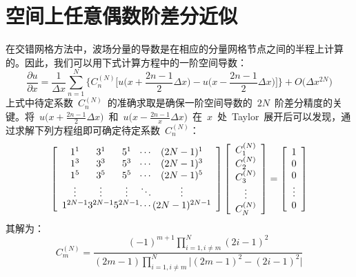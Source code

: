\documentclass[UTF8]{ctexart}
\begin{document}
\section{空间上任意偶数阶差分近似}
在交错网格方法中，波场分量的导数是在相应的分量网格节点之间的半程上计算的。因此，我们可以用下式计算方程中的一阶空间导数：
\begin{equation}\label{eq:dudx}
\frac{\partial u}{\partial x}=\frac{1}{\Delta x}\sum_{n=1}^N\Big\{C_n^{(N)}\big[u\big(x+\frac{2n-1}{2}\Delta x\big)-u\big(x-\frac{2n-1}{2}\Delta x\big)\big]\Big\}+O\big(\Delta x^{2N}\big)
\end{equation}
上式中待定系数~$C_n^{(N)}$~的准确求取是确保一阶空间导数的~$2N$~阶差分精度的关键。将~$u\big(x+\frac{2n-1}{2}\Delta x\big)$~和~$u\big(x-\frac{2n-1}{x}\Delta x\big)$~在~$x$~处~Taylor~展开后可以发现，通过求解下列方程组即可确定待定系数~$C_n^{(N)}$：
\[ \left[ \begin{array}{c@{}c@{}c@{}c@{}c}
1^1      & 3^1      & 5^1      & \cdots & (2N-1)^1      \\
1^3      & 3^3      & 5^3      & \cdots & (2N-1)^3      \\
1^5      & 3^5      & 5^5      & \cdots & (2N-1)^5      \\
\vdots   & \vdots   & \vdots   & \ddots & \vdots        \\
1^{2N-1} & 3^{2N-1} & 5^{2N-1} & \cdots & (2N-1)^{2N-1}
\end{array}\right]
\left[\begin{array}{c}
C_1^{(N)} \\
C_2^{(N)} \\
C_3^{(N)} \\
\vdots    \\
C_N^{(N)} \\
\end{array}\right]=
\left[\begin{array}{c}
1      \\
0      \\
0      \\
\vdots \\
0      \\
\end{array} \right] \]
其解为：
\begin{equation}
C_m^{(N)}=\frac{(-1)^{m+1}\prod\limits_{i=1,i\neq m}^N(2i-1)^2}{(2m-1)\prod\limits_{i=1,i\neq m}^N\big|(2m-1)^2-(2i-1)^2\big|}
\end{equation}\par
\end{document}

